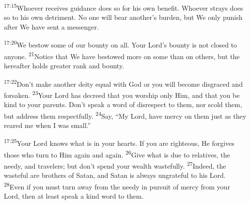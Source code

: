 \documentclass[openany,12pt,english]{book}
\newenvironment{para}{\par\pretolerance=100\tolerance=200\setlength{\emergencystretch}{0.6em}\relax}{\par}
\begin{document}
\bigskip{}

\begin{para}
    \textsuperscript{17:15}\thinspace{}Who\-ev\-er receives guid\-ance does so for his own ben\-e\-fit. Who\-ev\-er strays does so to his own det\-ri\-ment. No one will bear another's bur\-den, but We on\-ly pun\-ish af\-ter We have sent a mes\-sen\-ger.
\end{para}

\begin{para}
    \textsuperscript{17:20}\thinspace{}We be\-stow some of our boun\-ty on all. Your Lord's boun\-ty is not closed to any\-one.
    \textsuperscript{21}\thinspace{}No\-tice that We have bestowed more on some than on others, but the here\-af\-ter holds greater rank and boun\-ty.
\end{para}

\begin{para}
    \textsuperscript{17:22}\thinspace{}Don't make an\-oth\-er de\-i\-ty e\-qual with God or you will be\-come dis\-graced and for\-sak\-en.
    \textsuperscript{23}\thinspace{}Your Lord has de\-creed that you wor\-ship on\-ly Him, and that you be kind to your parents. Don't speak a word of dis\-re\-spect to them, nor scold them, but ad\-dress them re\-spect\-ful\-ly.
    \textsuperscript{24}\thinspace{}Say, “My Lord, have mer\-cy on them just as they reared me when I was small.”
\end{para}

\begin{para}
    \textsuperscript{17:25}\thinspace{}Your Lord knows what is in your hearts. If you are right\-eous, He forgives those who turn to Him again and again.
    \textsuperscript{26}\thinspace{}Give what is due to relatives, the needy, and travelers; but don't spend your wealth wastefully.
    \textsuperscript{27}\thinspace{}In\-deed, the waste\-ful are brothers of Satan, and Satan is al\-ways un\-grate\-ful to his Lord.
    \textsuperscript{28}\thinspace{}E\-ven if you must turn a\-way from the needy in pur\-suit of mer\-cy from your Lord, then at least speak a kind word to them.
\end{para}
\end{document}
